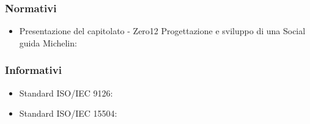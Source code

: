 \subsubsection{Normativi}
\begin{itemize}
\item Presentazione del capitolato - Zero12 Progettazione e sviluppo di una Social guida Michelin: \newline{}
\end{itemize}

\subsubsection{Informativi}
\begin{itemize}
\item Standard ISO/IEC 9126: \newline{}
\item Standard ISO/IEC 15504: \newline{}

\end{itemize}

